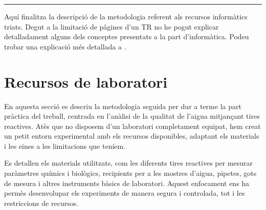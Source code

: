 \vspace*{2truecm}
\hrule
\vspace*{1truecm}

Aquí finalitza la descripció de la metodologia referent als recursos informàtics triats. Degut a la limitació de pâgines d'un TR no he pogut explicar detalladament alguns dels conceptes presentats a la part d'informàtica. Podeu trobar una explicació més detallada a .


\clearpage


\section{Recursos de laboratori} \label{s:recursos}
En aquesta secció es descriu la metodologia seguida per dur a terme la part pràctica del treball, centrada en l’anàlisi de la qualitat de l’aigua mitjançant tires reactives. Atès que no disposem d’un laboratori completament equipat, hem creat un petit entorn experimental amb els recursos disponibles, adaptant els materials i les eines a les limitacions que teníem.

Es detallen els materials utilitzats, com les diferents tires reactives per mesurar paràmetres químics i biològics, recipients per a les mostres d’aigua, pipetes, gots de mesura i altres instruments bàsics de laboratori. Aquest enfocament ens ha permès desenvolupar els experiments de manera segura i controlada, tot i les restriccions de recursos.

